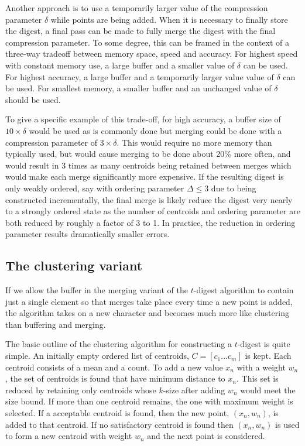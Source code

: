 \documentclass[11pt]{amsart}
\begin{document}
Another approach is to use a temporarily larger value of the compression parameter $\delta$ while points are being added. When it is necessary to finally store the digest, a final pass can be made to fully merge the digest with the final compression parameter. To some degree, this can be framed in the context of a three-way tradeoff between memory space, speed and accuracy. For highest speed with constant memory use, a large buffer and a smaller value of $\delta$ can be used. For highest accuracy, a large buffer and a temporarily larger value value of $\delta$ can be used. For smallest memory, a smaller buffer and an unchanged value of $\delta$ should be used. 

To give a specific example of this trade-off, for high accuracy, a buffer size of $10\times\delta$ would be used as is commonly done but merging could be done with a compression parameter of $3\times\delta$. This would require no more memory than typically used, but would cause merging to be done about 20\% more often, and would result in 3 times as many centroids being retained between merges which would make each merge significantly more expensive. If the resulting digest is only weakly ordered, say with ordering parameter $\Delta \le 3$ due to being constructed incrementally, the final merge is likely reduce the digest very nearly to a strongly ordered state as the number of centroids and ordering parameter are both reduced by roughly a factor of 3 to 1. In practice, the reduction in ordering parameter results dramatically smaller errors.

\subsection{The clustering variant}
If we allow the buffer in the merging variant of the $t$-digest algorithm to contain just a single element so that merges take place every time a new point is added, the algorithm takes on a new character and becomes much more like clustering than buffering and merging.

The basic outline of the clustering algorithm for constructing a $t$-digest is quite simple.  An initially empty ordered list of centroids, $C = [ c_1 \ldots c_m ]$ is kept.  Each centroid consists of a mean and a count.  To add a new value $x_n$ with a weight $w_n$, the set of centroids is found that have minimum distance to $x_n$.  This set is reduced by retaining only centroids whose $k$-size after adding $w_n$ would meet the size bound.  If more than one centroid remains, the one with maximum weight is selected.  If a acceptable centroid is found, then the new point, $(x_n,w_n)$, is added to that centroid. If no satisfactory centroid is found then $(x_n,w_n)$ is used to form a new centroid with weight $w_n$ and the next point is considered. 
\end{document}
